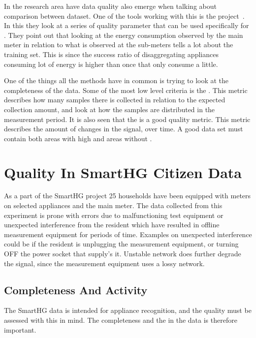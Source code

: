 In the  research area have data quality also emerge when talking about comparison between dataset. One of the tools working with this is the  project~\citep{RefWorks:21}. In this they look at a series of quality parameter that can be used specifically for . They point out that looking at the energy consumption observed by the main meter in relation to what is observed at the sub-meters tells a lot about the training set. This is since the success ratio of disaggregating appliances consuming lot of energy is higher than once that only consume a little. 

One of the things all the methods have in common is trying to look at the completeness of the data. Some of the most low level criteria is the . This metric describes how many samples there is collected in relation to the expected collection amount, and look at how the samples are distributed in the measurement period. It is also seen that the  is a good quality metric. This metric describes the amount of changes in the signal, over time. A good data set must contain both areas with high  and areas without . 

\newpage

\section{Quality In SmartHG Citizen Data}
As a part of the SmartHG project 25 households have been equipped with meters on selected appliances and the main meter. The data collected from this experiment is prone with errors due to malfunctioning test equipment or unexpected interference from the resident which have resulted in offline measurement equipment for periods of time. Examples on unexpected interference could be if the resident is unplugging the measurement equipment, or turning OFF the power socket that supply's it. Unstable network does further degrade the signal, since the measurement equipment uses a lossy network. 

\subsection{Completeness And Activity}
The SmartHG data is intended for appliance recognition, and the quality must be assessed with this in mind. The completeness and the  in the data is therefore important. 

